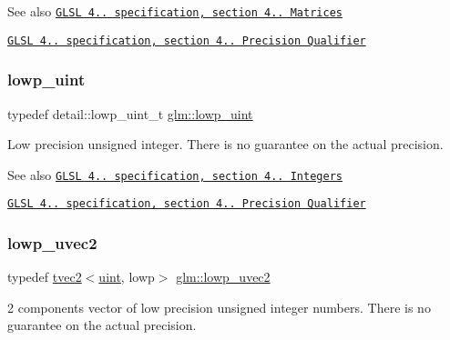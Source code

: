 \begin{DoxySeeAlso}{See also}
\href{http://www.opengl.org/registry/doc/GLSLangSpec.4.20.8.pdf}{\tt G\+L\+SL 4.. specification, section 4.. Matrices} 

\href{http://www.opengl.org/registry/doc/GLSLangSpec.4.20.8.pdf}{\tt G\+L\+SL 4.. specification, section 4.. Precision Qualifier} 
\end{DoxySeeAlso}
\mbox{\label{group__core__precision_ga8077c90f2c87e419ea6c273157dcc1fc}} 
\subsubsection{\texorpdfstring{lowp\+\_\+uint}{lowp\_uint}}
{\footnotesize\ttfamily typedef detail\+::lowp\+\_\+uint\+\_\+t \hyperlink{group__core__precision_ga8077c90f2c87e419ea6c273157dcc1fc}{glm\+::lowp\+\_\+uint}}

Low precision unsigned integer. There is no guarantee on the actual precision.

\begin{DoxySeeAlso}{See also}
\href{http://www.opengl.org/registry/doc/GLSLangSpec.4.20.8.pdf}{\tt G\+L\+SL 4.. specification, section 4.. Integers} 

\href{http://www.opengl.org/registry/doc/GLSLangSpec.4.20.8.pdf}{\tt G\+L\+SL 4.. specification, section 4.. Precision Qualifier} 
\end{DoxySeeAlso}
\mbox{\label{group__core__precision_ga0eec567054355374c84c7971a07d274c}} 
\subsubsection{\texorpdfstring{lowp\+\_\+uvec2}{lowp\_uvec2}}
{\footnotesize\ttfamily typedef \hyperlink{structglm_1_1tvec2}{tvec2}$<$\hyperlink{group__core__precision_ga4fd29415871152bfb5abd588334147c8}{uint}, lowp$>$ \hyperlink{group__core__precision_ga0eec567054355374c84c7971a07d274c}{glm\+::lowp\+\_\+uvec2}}

2 components vector of low precision unsigned integer numbers. There is no guarantee on the actual precision.

